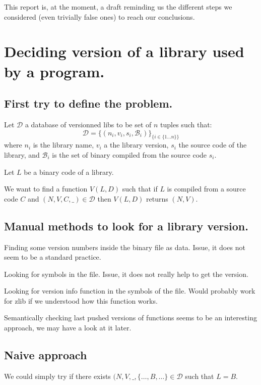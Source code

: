 \documentclass{article}
\begin{document}
    This report is, at the moment, a draft reminding us the different steps we
    considered (even trivially false ones) to reach our conclusions.

   \section{Deciding version of a library used by a program.} 

   \subsection{First try to define the problem.}

   Let $\mathcal{D}$ a database of versionned libs to be set of $n$ tuples such that:
    \[ \mathcal{D} = \{ (n_i, v_i, s_i, \mathcal{B}_i) \}_{\{i \in \{1 \dots n\}\}}  \]
    where $n_i$ is the library name, $v_i$ a the library version, $s_i$ the source
    code of the library, and $\mathcal{B}_i$ is the set of binary compiled
    from the source code $s_i$. 

    Let $L$ be a binary code of a library.

    We want to find a function $V(L,D)$ such that if $L$ is compiled from a
    source code $C$ and $(N, V, C, \_) \in \mathcal{D}$ then $V(L,D)$ returns
    $(N,V)$.

    \subsection{Manual methods to look for a library version.}
    Finding some version numbers inside the binary file as data.
    Issue, it does not seem to be a standard practice.

    Looking for symbols in the file. 
    Issue, it does not really help to get the version.

    Looking for version info function in the symbols of the file. Would
    probably work for zlib if we understood how this function works.
    
    Semantically checking last pushed versions of functions seems to be an
    interesting approach, we may have a look at it later.

    \subsection{Naive approach}
    We could simply try if there exists $(N, V, \_, \{\dots, B, \dots\} \in
    \mathcal{D}$ such that $L = B$.
\end{document}
